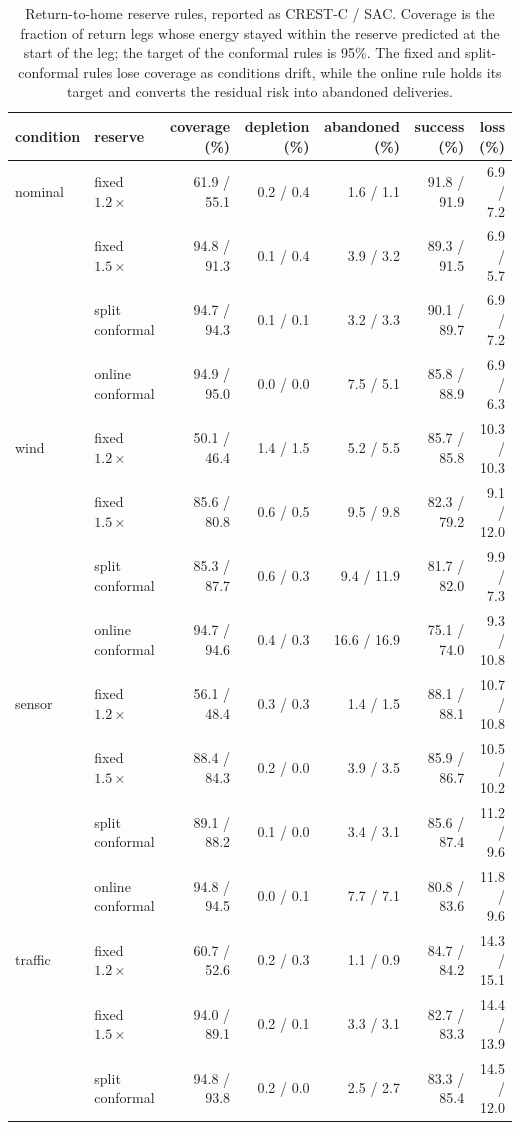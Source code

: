 \begin{table}[tb]
\centering
\caption{Return-to-home reserve rules, reported as CREST-C / SAC. Coverage is the fraction of return legs whose energy stayed within the reserve predicted at the start of the leg; the target of the conformal rules is 95\%. The fixed and split-conformal rules lose coverage as conditions drift, while the online rule holds its target and converts the residual risk into abandoned deliveries.}
\label{tab:reserve}
\small
\begin{tabular}{llrrrrr}
\toprule
condition & reserve & coverage (\%) & depletion (\%) & abandoned (\%) & success (\%) & loss (\%) \\
\midrule
nominal & fixed $1.2\times$ & 61.9 / 55.1 & 0.2 / 0.4 & 1.6 / 1.1 & 91.8 / 91.9 & 6.9 / 7.2 \\
 & fixed $1.5\times$ & 94.8 / 91.3 & 0.1 / 0.4 & 3.9 / 3.2 & 89.3 / 91.5 & 6.9 / 5.7 \\
 & split conformal & 94.7 / 94.3 & 0.1 / 0.1 & 3.2 / 3.3 & 90.1 / 89.7 & 6.9 / 7.2 \\
 & online conformal & 94.9 / 95.0 & 0.0 / 0.0 & 7.5 / 5.1 & 85.8 / 88.9 & 6.9 / 6.3 \\
\addlinespace[2pt]
wind & fixed $1.2\times$ & 50.1 / 46.4 & 1.4 / 1.5 & 5.2 / 5.5 & 85.7 / 85.8 & 10.3 / 10.3 \\
 & fixed $1.5\times$ & 85.6 / 80.8 & 0.6 / 0.5 & 9.5 / 9.8 & 82.3 / 79.2 & 9.1 / 12.0 \\
 & split conformal & 85.3 / 87.7 & 0.6 / 0.3 & 9.4 / 11.9 & 81.7 / 82.0 & 9.9 / 7.3 \\
 & online conformal & 94.7 / 94.6 & 0.4 / 0.3 & 16.6 / 16.9 & 75.1 / 74.0 & 9.3 / 10.8 \\
\addlinespace[2pt]
sensor & fixed $1.2\times$ & 56.1 / 48.4 & 0.3 / 0.3 & 1.4 / 1.5 & 88.1 / 88.1 & 10.7 / 10.8 \\
 & fixed $1.5\times$ & 88.4 / 84.3 & 0.2 / 0.0 & 3.9 / 3.5 & 85.9 / 86.7 & 10.5 / 10.2 \\
 & split conformal & 89.1 / 88.2 & 0.1 / 0.0 & 3.4 / 3.1 & 85.6 / 87.4 & 11.2 / 9.6 \\
 & online conformal & 94.8 / 94.5 & 0.0 / 0.1 & 7.7 / 7.1 & 80.8 / 83.6 & 11.8 / 9.6 \\
\addlinespace[2pt]
traffic & fixed $1.2\times$ & 60.7 / 52.6 & 0.2 / 0.3 & 1.1 / 0.9 & 84.7 / 84.2 & 14.3 / 15.1 \\
 & fixed $1.5\times$ & 94.0 / 89.1 & 0.2 / 0.1 & 3.3 / 3.1 & 82.7 / 83.3 & 14.4 / 13.9 \\
 & split conformal & 94.8 / 93.8 & 0.2 / 0.0 & 2.5 / 2.7 & 83.3 / 85.4 & 14.5 / 12.0 \\

\end{tabular}
\end{table}
